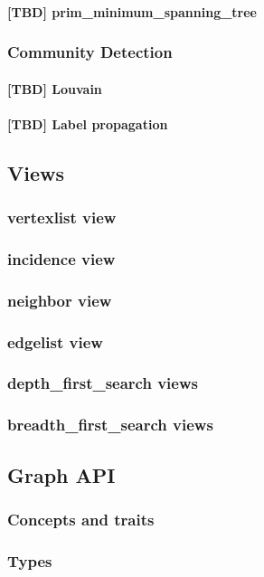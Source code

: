 \documentclass[10pt,onecolumn]{article}
\begin{document}
\paragraph{[TBD] prim\_minimum\_spanning\_tree}
\subsubsection{Community Detection}
\paragraph{[TBD] Louvain}
\paragraph{[TBD] Label propagation}

\subsection{Views}
\subsubsection{vertexlist view}
\subsubsection{incidence view}
\subsubsection{neighbor view}
\subsubsection{edgelist view}
\subsubsection{depth\_first\_search views}
\subsubsection{breadth\_first\_search views}
\subsection{Graph API}
\subsubsection{Concepts and traits}
\subsubsection{Types}
\end{document}

